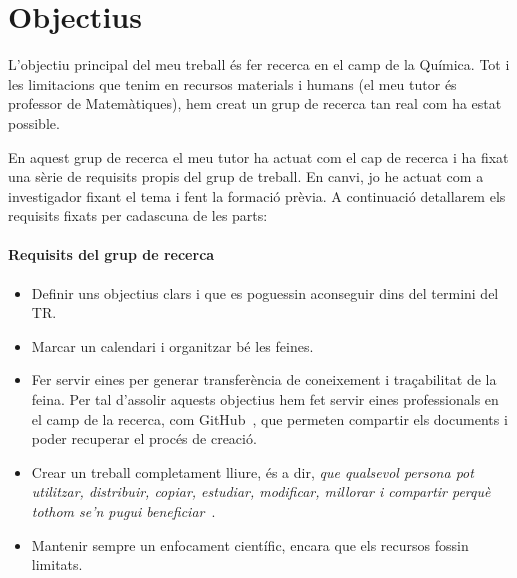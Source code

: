 \chapter{Objectius}
\label{c:objectius}
L'objectiu principal del meu treball és fer recerca en el camp de la Química. Tot i les limitacions que tenim en recursos materials i humans (el meu tutor és professor de Matemàtiques), hem creat un grup de recerca tan real com ha estat possible.

En aquest grup de recerca el meu tutor ha actuat com el cap de recerca i ha fixat una sèrie de requisits propis del grup de treball. En canvi, jo he actuat com a investigador fixant el tema i fent la formació prèvia.
A continuació detallarem els requisits fixats per cadascuna de les parts:

\subsubsection*{Requisits del grup de recerca}
\begin{itemize}
    \item Definir uns objectius clars i que es poguessin aconseguir dins del termini del TR.
    \item Marcar un calendari i organitzar bé les feines.
    \item Fer servir eines per generar transferència de coneixement i traçabilitat de la feina. Per tal d'assolir aquests objectius hem fet servir eines professionals en el camp de la recerca, com GitHub~\cite{GitHub}, que permeten compartir els documents i poder recuperar el procés de creació.
    \item Crear un treball completament lliure, és a dir, \textit{que qualsevol persona pot utilitzar, distribuir, copiar, estudiar, modificar, millorar i compartir perquè tothom se'n pugui beneficiar}~\cite{programariLliure}.
    \item Mantenir sempre un enfocament científic, encara que els recursos fossin limitats.
\end{itemize}


